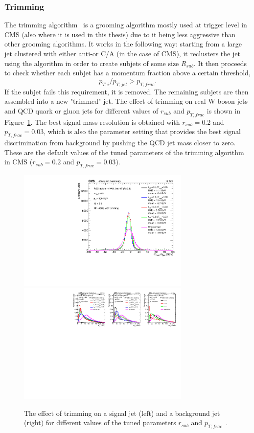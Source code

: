\subsubsection{Trimming}
\label{sec:objreco:trimming}
The trimming algorithm~\cite{Krohn:2009th} is a grooming algorithm mostly used at trigger level in CMS (also where it is used in this thesis) due to it being less aggressive than other grooming algorithms. It works in the following way: starting from a large jet clustered with either anti-\kt or C/A (in the case of CMS), it reclusters the jet using the \kt algorithm in order to create subjets of some size $R_{sub}$.  It then proceeds to check whether each subjet has a momentum fraction above a certain threshold,
\begin{equation*}
p_{T,i}/p_{T,jet}>p_{T,frac}.
\end{equation*}
If the subjet fails this requirement, it is removed. The remaining subjets are then assembled into a new "trimmed" jet.
The effect of trimming on real W boson jets and QCD quark or gluon jets for different values of $r_{sub}$ and $p_{T,frac}$ is shown in Figure~\ref{fig:objreco:trimming}. 
The best signal mass resolution is obtained with $r_{sub}=0.2$ and $p_{T,frac}=0.03$, which is also the parameter setting that provides the best signal discrimination from background by pushing the QCD jet mass closer to zero. These are the default values of the tuned parameters of the trimming algorithm in CMS ($r_{sub}=0.2$ and $p_{T,frac}=0.03$).
\begin{figure}[h] 
    \centering 
    \includegraphics[height=6cm]{figures/event_reconstruction/sig_trimming.pdf}
    \includegraphics[height=6cm]{figures/event_reconstruction/bkg_trimming-noData.pdf}
    \caption{The effect of trimming on a signal jet (left) and a background jet (right) for different values of the tuned parameters $r_{sub}$ and $p_{T,frac}$~\cite{CMS-PAS-JME-14-001}.}
    \label{fig:objreco:trimming}
\end{figure}

